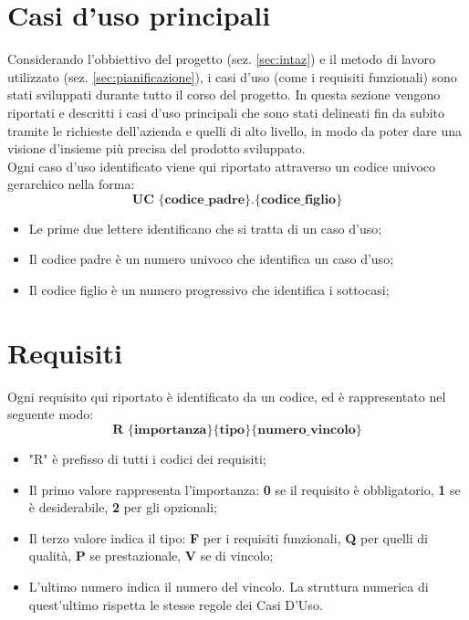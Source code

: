 \section{Casi d'uso principali}
Considerando l'obbiettivo del progetto (sez. \ref{sec:intaz}) e il metodo di 
lavoro utilizzato (sez. \ref{sec:pianificazione}), i casi d'uso (come i requisiti 
funzionali) sono stati sviluppati durante tutto il corso del progetto. 
In questa sezione vengono riportati e descritti i casi d'uso principali che 
sono stati delineati fin da subito tramite le richieste dell'azienda e quelli 
di alto livello, in modo da poter dare una visione d’insieme più precisa del 
prodotto sviluppato. \\

Ogni caso d'uso identificato viene qui riportato attraverso un codice univoco 
gerarchico nella forma:
$$ \textbf{UC \{codice\_padre\}.\{codice\_figlio\}  } $$
\begin{itemize}
	\item Le prime due lettere identificano che si tratta di un caso d'uso;
	\item Il codice padre è un numero univoco che identifica un caso d'uso;
	\item Il codice figlio è un numero progressivo che identifica i sottocasi;\\
\end{itemize}




\section{Requisiti}
Ogni requisito qui riportato è identificato da un codice, ed è rappresentato nel seguente modo:
$$ \textbf{R \{importanza\}\{tipo\}\{numero\_vincolo\} } $$

\begin{itemize}
	\item "R" è prefisso di tutti i codici dei requisiti;
	\item Il primo valore rappresenta l'importanza: \textbf{0} se il requisito è obbligatorio, \textbf{1} se è desiderabile, \textbf{2} per gli opzionali;
	\item Il terzo valore indica il tipo: \textbf{F} per i requisiti funzionali, \textbf{Q} per quelli di qualità, \textbf{P} se prestazionale, \textbf{V} se di vincolo;
	\item L'ultimo numero indica il numero del vincolo. La struttura numerica di quest'ultimo rispetta le stesse regole dei Casi D'Uso.
\end{itemize}

